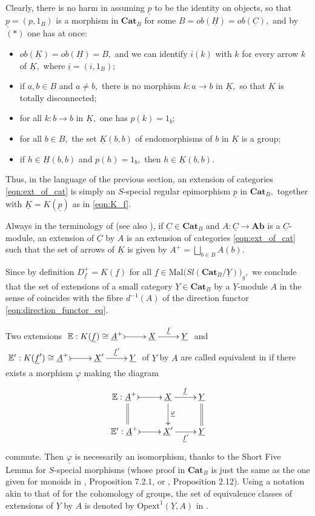 \documentclass[11pt]{amsart}
\theoremstyle{plain}
\theoremstyle{definition}
\theoremstyle{remark}
\newcommand{\un}{\underline}
\begin{document}
Clearly, there is no harm in assuming $\un{p}$ to be the identity on objects, so that $\un{p}=(p,1_B)$ is a morphism in $\mathbf{Cat}_B$  for some $B=ob(\un{H})=ob(\un{C}),$ and by $(\ast)$ one has at once:
\begin{itemize}
\item $ob(\un{K})=ob(\un{H})=B,$ and we can identify $i(k)$ with $k$ for every arrow $k$ of $\un{K},$ where $\un{i}=(i,1_B);$
\item if $a,b\in B$ and $a\neq b,$ there is no morphism $k\colon a\rightarrow b$ in $\un{K},$ so that $\un{K}$ is totally disconnected;
\item for all $k\colon b\rightarrow b$ in $\un{K},$ one has $p(k)=1_b;$
\item for all $b\in B,$ the set $\un{K}(b,b)$ of endomorphisms of $b$ in $\un{K}$ is a group;
\item if $h\in \un{H}(b,b)$ and $p(h)=1_b,$ then $h\in\un{K}(b,b).$
\end{itemize}
Thus, in the language of the previous section, an extension of categories \eqref{eqn:ext_of_cat} is simply an $S$-special regular epimorphism $\un{p}$ in $\mathbf{Cat}_B,$ together with $\un{K}=K(\un{p})$ as in \eqref{eqn:K_f}.

Always in the terminology of \cite{cocat} (see also \cite{golasinski}), if $\un{C}\in\mathbf{Cat}_B$ and $A\colon\un{C}\rightarrow\mathbf{Ab}$ is a $\un{C}$-module, an extension of $\un{C}$ by $A$ is an extension of categories \eqref{eqn:ext_of_cat} such that the set of arrows of $\un{K}$ is given by $A^+=\bigsqcup_{b\in B}A(b).$

Since by definition $D_{\un{f}}^+=K(\un{f})$ for all $\un{f}\in\mathrm{Mal}\big(Sl(\mathbf{Cat}_B/\un{Y})\big)_g,$ we conclude that the set of extensions of a small category $\un{Y}\in\mathbf{Cat}_B$ by a $\un{Y}$-module $A$ in the sense of \cite{cocat, golasinski} coincides with the fibre $d^{-1}(A)$ of the direction functor \eqref{eqn:direction_functor_eq}.

Two extensions $\xymatrix{{\mathbb{E}:K(\un{f})\cong\un{A}^+} \ar@{>->}[r] &{\un{X}} \ar[r]^-{\un{f}} &{\un{Y}}}$ and $\xymatrix{{\mathbb{E}^\prime:K(\un{f}^\prime)\cong\un{A}^+} \ar@{>->}[r] &{\un{X}^\prime} \ar[r]^-{\un{f}^\prime} &{\un{Y}}}$ of $\un{Y}$ by $A$ are called equivalent in \cite{cocat, golasinski, hoff} if there exists a morphism $\un{\varphi}$ making the diagram
\begin{equation*}
\xymatrix{
{\mathbb{E}:\un{A}^+} \ar@<.9ex>@{=}[d] \ar@{>->}[r] &{\un{X}} \ar[d]^-{\un{\varphi}} \ar[r]^-{\un{f}} &{\un{Y}} \ar@{=}[d] \\
{\mathbb{E}^\prime:\un{A}^+} \ar@{>->}[r] &{\un{X}^\prime} \ar[r]_-{\un{f}^\prime} &{\un{Y}}
}
\end{equation*}
commute. Then $\un{\varphi}$ is necessarily an isomorphism, thanks to the Short Five Lemma for $S$-special morphisms (whose proof in $\mathbf{Cat}_B$ is just the same as the one given for monoids in \cite{schreier_book}, Proposition 7.2.1, or \cite{MMS18}, Proposition 2.12). Using a notation akin to that of \cite{homology} for the cohomology of groups, the set of equivalence classes of extensions of $\un{Y}$ by $A$ is denoted by $\mathrm{Opext}^1(\un{Y},A)$ in \cite{golasinski}.
\end{document}
